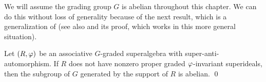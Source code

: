We will assume the grading group $G$ is abelian throughout this chapter. 
We can do this without loss of generality because of the next result, which is a generalization of \cite[Theorem 1]{BSZ05} (see also \cite[Proposition 2.49]{livromicha} and its proof, which works in this more general situation). 

\begin{prop}\label{prop:grd-simple-vphi-abelian}
    Let $(R, \varphi)$ be an associative $G$-graded superalgebra with super-anti-automorphism. 
    If $R$ does not have nonzero proper graded $\varphi$-invariant superideals, then the subgroup of $G$ generated by the support of $R$ is abelian. \qed 
\end{prop}












